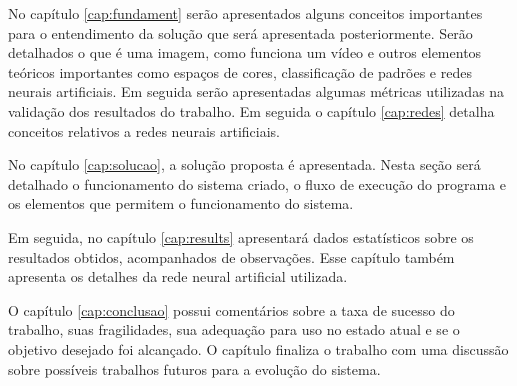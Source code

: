 			No capítulo \ref{cap:fundament} serão apresentados alguns conceitos importantes para o entendimento da solução que será apresentada posteriormente. Serão detalhados o que é uma imagem, como funciona um vídeo e outros elementos teóricos importantes como espaços de cores, classificação de padrões e redes neurais artificiais. Em seguida serão apresentadas algumas métricas utilizadas na validação dos resultados do trabalho. Em seguida o capítulo \ref{cap:redes} detalha conceitos relativos a redes neurais artificiais.
			
			No capítulo \ref{cap:solucao}, a solução proposta é apresentada. Nesta seção será detalhado o funcionamento do sistema criado, o fluxo de execução do programa e os elementos que permitem o funcionamento do sistema.
			
			Em seguida, no capítulo \ref{cap:results} apresentará dados estatísticos sobre os resultados obtidos, acompanhados de observações. Esse capítulo também apresenta os detalhes da rede neural artificial utilizada.
			
			O capítulo \ref{cap:conclusao} possui comentários sobre a taxa de sucesso do trabalho, suas fragilidades, sua adequação para uso no estado atual e se o objetivo desejado foi alcançado. O capítulo finaliza o trabalho com uma discussão sobre possíveis trabalhos futuros para a evolução do sistema.\cite{de2006introduccao}
			
			








